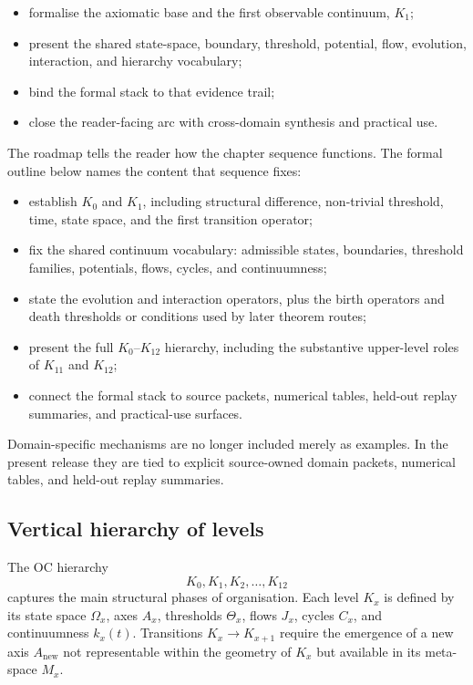 \begin{itemize}
    \item formalise the axiomatic base and the first observable continuum,
          \(K_1\);
    \item present the shared state-space, boundary, threshold, potential, flow,
          evolution, interaction, and hierarchy vocabulary;
    \item bind the formal stack to that evidence trail;
    \item close the reader-facing arc with cross-domain synthesis and
          practical use.
\end{itemize}

The roadmap tells the reader how the chapter sequence functions. The formal
outline below names the content that sequence fixes:

\begin{itemize}
    \item establish \(K_0\) and \(K_1\), including structural difference,
          non-trivial threshold, time, state space, and the first transition
          operator;
    \item fix the shared continuum vocabulary: admissible states, boundaries,
          threshold families, potentials, flows, cycles, and continuumness;
    \item state the evolution and interaction operators, plus the birth
          operators and death thresholds or conditions used by later theorem
          routes;
    \item present the full \(K_0\)–\(K_{12}\) hierarchy, including the
          substantive upper-level roles of \(K_{11}\) and \(K_{12}\);
    \item connect the formal stack to source packets, numerical tables,
          held-out replay summaries, and practical-use surfaces.
\end{itemize}

Domain-specific mechanisms are no longer included merely as examples. In the
present release they are tied to explicit source-owned domain packets,
numerical tables, and held-out replay summaries.

\subsection{Vertical hierarchy of levels}

The OC hierarchy
\[
K_0, K_1, K_2, \dots, K_{12}
\]
captures the main structural phases of organisation. Each level \(K_x\) is defined by its state space \(\Omega_x\), axes \(A_x\), thresholds \(\Theta_x\), flows \(J_x\), cycles \(C_x\), and continuumness \(k_x(t)\). Transitions \(K_x \to K_{x+1}\) require the emergence of a new axis \(A_{\mathrm{new}}\) not representable within the geometry of \(K_x\) but available in its meta-space \(M_x\).


